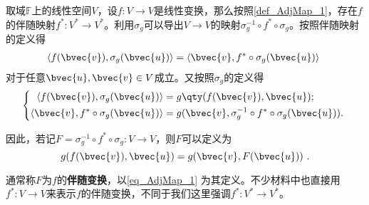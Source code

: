取域$\mathbb{F}$上的线性空间$V$，设$f:V\to V$是线性变换，那么按照\autoref{def_AdjMap_1}，存在$f$的伴随映射$f^*:V^*\to V^*$。利用$\sigma_g$可以导出$V\to V$的映射$\sigma_g^{-1}\circ f^*\circ \sigma_g$。按照伴随映射的定义得
\begin{equation}
\begin{aligned}
\langle f(\bvec{v}), \sigma_g(\bvec{u}) \rangle = \langle \bvec{v} , f^*\circ \sigma_g(\bvec{u}) \rangle
\end{aligned}~
\end{equation}
对于任意$\bvec{u}, \bvec{v}\in V$成立。又按照$\sigma_g$的定义得
\begin{equation}
\left\{
\begin{aligned}
\langle f(\bvec{v}), \sigma_g(\bvec{u}) \rangle ={}& g\qty(f(\bvec{v}), \bvec{u}); \\
\langle \bvec{v} , f^*\circ \sigma_g(\bvec{u}) \rangle={}& g(\bvec{v}, \sigma_g^{-1}\circ f^*\circ \sigma_g(\bvec{u})). 
\end{aligned}
\right. ~
\end{equation}

因此，若记$F=\sigma_g^{-1}\circ f^*\circ \sigma_g:V\to V$，则$F$可以定义为
\begin{equation}\label{eq_AdjMap_1}
g(f(\bvec{v}), \bvec{u}) = g(\bvec{v}, F(\bvec{u}))~. 
\end{equation}

通常称$F$为$f$的\textbf{伴随变换}，以\autoref{eq_AdjMap_1} 为其定义。不少材料中也直接用$f^*:V\to V$来表示$f$的伴随变换，不同于我们这里强调$f^*:V^*\to V^*$。




















